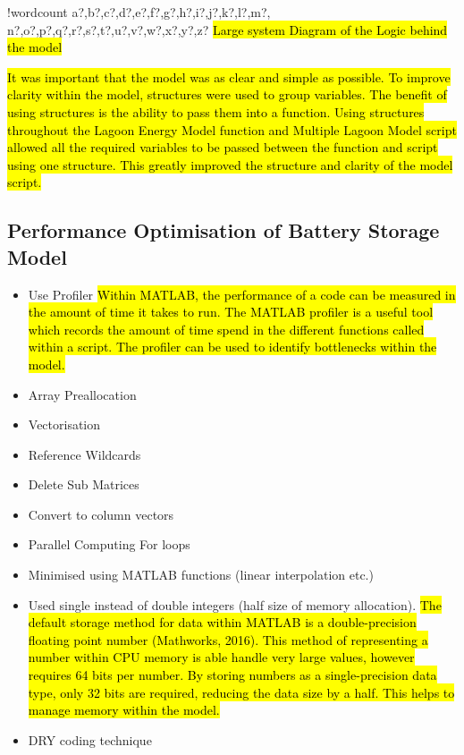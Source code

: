 \documentclass[fontsize=9.5pt]{extarticle}
\numberwithin{figure}{section} %
\providecommand{\tightlist}{%
  \setlength{\itemsep}{0pt}\setlength{\parskip}{0pt}}
\newcounter{words}
\newenvironment{counted}{%
  \setcounter{words}{0}
  \SearchList!{wordcount}{\stepcounter{words}}
    {a?,b?,c?,d?,e?,f?,g?,h?,i?,j?,k?,l?,m?,
    n?,o?,p?,q?,r?,s?,t?,u?,v?,w?,x?,y?,z?}
  \UndoBoundary{'}
  \SearchOrder{p;}}{%
  \StopSearching}
\begin{document}
\begin{counted}
\hl{Large system Diagram of the Logic behind the model}

\hl{It was important that the model was as clear and simple as possible. To improve clarity within the model, structures were used to group variables. The benefit of using structures is the ability to pass them into a function. Using structures throughout the Lagoon Energy Model function and Multiple Lagoon Model script allowed all the required variables to be passed between the function and script using one structure. This greatly improved the structure and clarity of the model script.}

\subsection{Performance Optimisation of Battery Storage
Model}\label{performance-optimisation-of-battery-storage-model}

\autocite{getreuer5685writing}

\begin{itemize}
\tightlist
\item
  Use Profiler
  \hl{Within MATLAB, the performance of a code can be measured in the amount of time it takes to run. The MATLAB profiler is a useful tool which records the amount of time spend in the different functions called within a script. The profiler can be used to identify bottlenecks within the model.}
\item
  Array Preallocation
\item
  Vectorisation
\item
  Reference Wildcards
\item
  Delete Sub Matrices
\item
  Convert to column vectors
\item
  Parallel Computing For loops
\item
  Minimised using MATLAB functions (linear interpolation etc.)
\item
  Used single instead of double integers (half size of memory
  allocation).
  \hl{The default storage method for data within MATLAB is a double-precision floating point number (Mathworks, 2016). This method of representing a number within CPU memory is able handle very large values, however requires 64 bits per number. By storing numbers as a single-precision data type, only 32 bits are required, reducing the data size by a half. This helps to manage memory within the model.}
\item
  DRY coding technique
\end{itemize}


\end{counted}
\end{document}
